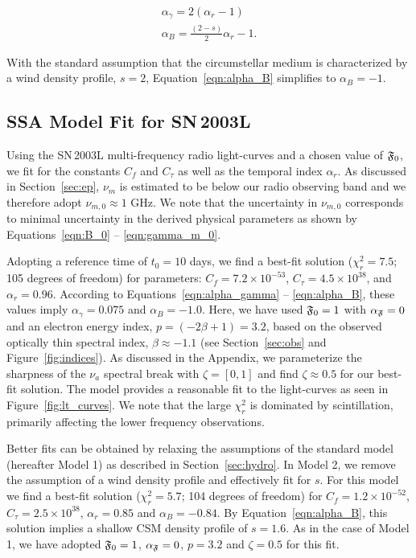 \documentclass[12pt,preprint]{aastex}
\begin{document}
\begin{gather}
\alpha_{\gamma}=2(\alpha_r-1)
\label{eqn:alpha_gamma} \\
\alpha_B=\frac{(2-s)}{2}\alpha_r - 1.
\label{eqn:alpha_B}
\end{gather}

\noindent
With the standard assumption that the circumstellar medium is
characterized by a wind density profile, $s=2$,
Equation~\ref{eqn:alpha_B} simplifies to $\alpha_B=-1$.

\subsection{SSA Model Fit for SN\,2003L}
\label{sec:ssa_model_fit}
Using the SN\,2003L multi-frequency radio light-curves and a chosen
value of $\frak{F}_0$, we fit for the constants $C_f$ and $C_{\tau}$
as well as the temporal index $\alpha_r$.  As discussed in
Section~\ref{sec:ep}, $\nu_m$ is estimated to be below our radio
observing band and we therefore adopt $\nu_{m,0}\approx 1$ GHz.  We
note that the uncertainty in $\nu_{m,0}$ corresponds to minimal
uncertainty in the derived physical parameters as shown by
Equations~\ref{eqn:B_0} -- \ref{eqn:gamma_m_0}.

Adopting a reference time of $t_0=10$ days, we find a best-fit
solution ($\chi^2_r=7.5$; 105 degrees of freedom) for
parameters: $C_f=7.2\times 10^{-53}$, $C_{\tau}=4.5\times 10^{38}$,
and $\alpha_r=0.96$.  According to Equations~\ref{eqn:alpha_gamma} --
\ref{eqn:alpha_B}, these values imply $\alpha_{\gamma}=0.075$
and $\alpha_B=-1.0$.  Here, we have used $\frak{F}_0=1$ with
$\alpha_{\frak{F}}=0$ and an electron energy index,
$p=(-2\beta+1)=3.2$, based on the observed optically thin spectral
index, $\beta\approx -1.1$ (see Section~\ref{sec:obs} and
Figure~\ref{fig:indices}).  As discussed in the Appendix, we
parameterize the sharpness of the $\nu_a$ spectral break with
$\zeta=[0,1]$ and find $\zeta\approx 0.5$ for our best-fit solution.
The model provides a reasonable fit to the light-curves as seen in
Figure~\ref{fig:lt_curves}.  We note that the large $\chi^2_r$ is
dominated by scintillation, primarily affecting the lower frequency
observations.

Better fits can be obtained by relaxing the assumptions of the
standard model (hereafter Model 1) as described in
Section~\ref{sec:hydro}.  In Model 2, we remove the assumption of a
wind density profile and effectively fit for $s$.  For this model we
find a best-fit solution ($\chi^2_r=5.7$; 104 degrees of freedom) for
$C_f=1.2\times 10^{-52}$, $C_{\tau}=2.5\times 10^{38}$,
$\alpha_r=0.85$ and $\alpha_B=-0.84$.  By Equation~\ref{eqn:alpha_B},
this solution implies a shallow CSM density profile of $s=1.6$.  As in
the case of Model 1, we have adopted $\frak{F}_0=1$,
$\alpha_{\frak{F}}=0$, $p=3.2$ and $\zeta=0.5$ for this fit. 
\end{document}
